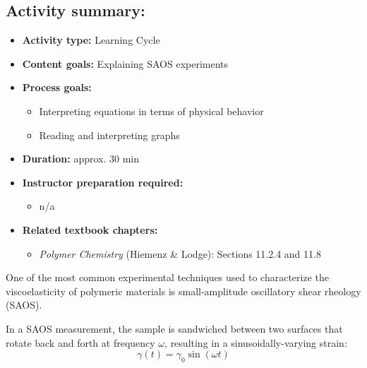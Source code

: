 \begin{activity}
\begin{instructornotes}
	\subsection*{Activity summary:}
	\begin{itemize}
		\item \textbf{Activity type:} Learning Cycle
		\item \textbf{Content goals:} Explaining SAOS experiments
		\item \textbf{Process goals:} %
			\begin{itemize}
				\item Interpreting equations in terms of physical behavior
				\item Reading and interpreting graphs
			\end{itemize}
		\item \textbf{Duration:} approx. 30 min
		\item \textbf{Instructor preparation required:} 
			\begin{itemize}
				\item n/a
			\end{itemize}
		\item \textbf{Related textbook chapters:}
			\begin{itemize}
				\item \emph{Polymer Chemistry} (Hiemenz \& Lodge): Sections 11.2.4 and 11.8
			\end{itemize}
	\end{itemize}

\end{instructornotes}



\begin{model}
\label{model:rheology}

	One of the most common experimental techniques used to characterize the viscoelasticity of polymeric materials is small-amplitude oscillatory shear rheology (SAOS).
	
	In a SAOS measurement, the sample is sandwiched between two surfaces that rotate back and forth at frequency $\omega$, resulting in a sinusoidally-varying strain:
	\begin{equation*}
		\gamma(t) = \gamma_0 \sin(\omega t)
	\end{equation*}
	

\end{model}
\end{activity}
